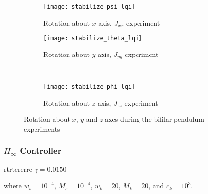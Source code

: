 \begin{figure}[H]
\begin{subfigure}{.5\linewidth}
\centering
\texttt{[image: stabilize\_psi\_lqi]}
\caption{Rotation about $x$ axis, $J_{xx}$ experiment}
\label{fig:stabilize_psi_lqi}
\end{subfigure}%
\begin{subfigure}{.5\linewidth}
\centering
\texttt{[image: stabilize\_theta\_lqi]}
\caption{Rotation about $y$ axis, $J_{yy}$ experiment}
\label{fig:stabilize_theta_lqi}
\end{subfigure}\\[1ex]
\begin{subfigure}{\linewidth}
\centering
\texttt{[image: stabilize\_phi\_lqi]}
\caption{Rotation about $z$ axis, $J_{zz}$ experiment}
\label{fig:stabilize_psi_lqi}
\end{subfigure}
\caption{Rotation about $x$, $y$ and $z$ axes during the bifilar pendulum experiments}
\label{fig:stabilize_lqi}
\end{figure}

\subsubsection{$H_\infty$ Controller}
rtrtererre
$\gamma = 0.0150$

where $w_{s} = 10^{-4}$, $M_{s} = 10^{-4}$, $w_{k} = 20$, $M_{k} = 20$, and $c_{k} = 10^{3}$.

